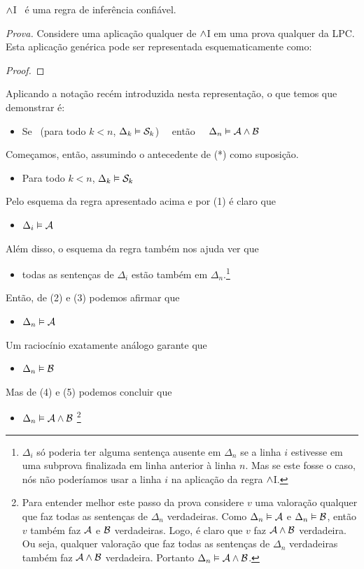 \begin{factoidboxe}
	$\wedge$I \ é uma regra de inferência confiável.
\end{factoidboxe}

\noindent\emph{Prova.} Considere uma aplicação qualquer de $\wedge$I em uma prova qualquer da LPC.
Esta aplicação genérica pode ser representada esquematicamente como:
\begin{proof}
	 
\end{proof}\noindent
Aplicando a notação recém introduzida nesta representação, o que temos que demonstrar é:
\begin{itemize}
	\item[(*)]  Se  \ ({para todo}  $k<n$, $\Delta_k \vDash \mathcal{S}_k$) \ \ então \ \ $\Delta_n \vDash \mathcal{A} \wedge \mathcal{B}$
\end{itemize}
Começamos, então, assumindo o antecedente de (*) como suposição.
\begin{itemize}
	\item[(1)] Para todo  $k<n$, $\Delta_k \vDash \mathcal{S}_k$
\end{itemize}
Pelo esquema da regra apresentado acima e por (1) é claro que
\begin{itemize}
	\item[(2)] $\Delta_i \vDash \mathcal{A}$
\end{itemize}
Além disso, o esquema da regra também nos ajuda ver que
\begin{itemize}
	\item[(3)] todas as sentenças de $\Delta_i$ estão também em $\Delta_n$.\footnote{
		$\Delta_i$ só poderia ter alguma sentença ausente em $\Delta_n$ se a linha $i$ estivesse em uma subprova finalizada em linha anterior à linha $n$. Mas se este fosse o caso, nós não poderíamos usar a linha $i$ na aplicação da regra $\wedge$I.}
\end{itemize}
Então, de (2) e (3) podemos afirmar que
\begin{itemize}
	\item[(4)] $\Delta_n \vDash \mathcal{A}$
\end{itemize}
Um raciocínio exatamente análogo garante que
\begin{itemize}
	\item[(5)]  $\Delta_n \vDash \mathcal{B}$
\end{itemize}
Mas de (4) e (5) podemos concluir que
\begin{itemize}
	\item[(6)]  $\Delta_n \vDash \mathcal{A} \wedge \mathcal{B}$ \footnote{
		Para entender melhor este passo da prova considere $v$ uma valoração qualquer que faz todas as sentenças de $\Delta_n$ verdadeiras.
		Como $\Delta_n \vDash \mathcal{A}$ e $\Delta_n \vDash \mathcal{B}$, então $v$ também faz $\mathcal{A}$ e $\mathcal{B}$ verdadeiras.
		Logo, é claro que $v$ faz $\mathcal{A} \wedge \mathcal{B}$ verdadeira.
		Ou seja, qualquer valoração que faz todas as sentenças de  $\Delta_n$ verdadeiras também faz $\mathcal{A} \wedge \mathcal{B}$ verdadeira.
		Portanto $\Delta_n \vDash \mathcal{A} \wedge \mathcal{B}$.}
\end{itemize}
